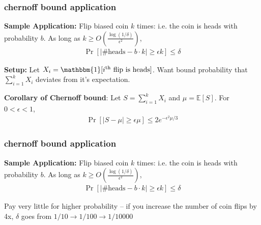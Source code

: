 \documentclass[handout,compress]{beamer}
\newcommand{\bv}[1]{\mathbf{#1}}
\newcommand{\E}{\mathbb{E}}
\begin{document}
\begin{frame}
	\frametitle{chernoff bound application}
	\small
	\textbf{Sample Application:} Flip biased coin $k$ times: i.e. the coin is heads with probability $b$. As long as $k \geq O\left(\frac{\log(1/\delta)}{\epsilon^2}\right)$,
	\vspace{-.5em}
	\begin{align*}
		\Pr[|\text{\# heads} - b\cdot k| \geq \epsilon k] \leq \delta 
	\end{align*}
	
	\textbf{Setup:}
	Let $X_i = \mathbbm{1}[i^\text{th} \text{ flip is heads}]$. Want bound probability that  $\sum_{i=1}^k X_i$ deviates from it's expectation.
	
	\textbf{Corollary of Chernoff bound}: Let $S = \sum_{i=1}^k X_i$ and $\mu = \E[S]$. For $0< \epsilon < 1$, 
	\vspace{-.75em}
	\begin{align*}
		\Pr[|S - \mu| \geq \epsilon \mu] \leq 2e^{-\epsilon^2 \mu/3}
	\end{align*} 
	\vspace{6em}
\end{frame}

\begin{frame}
	\frametitle{chernoff bound application}
	\textbf{Sample Application:} Flip biased coin $k$ times: i.e. the coin is heads with probability $b$. As long as $k \geq O\left(\frac{\log(1/\delta)}{\epsilon^2}\right)$,
	\begin{align*}
		\Pr[|\text{\# heads} - b\cdot k| \geq \epsilon k] \leq \delta 
	\end{align*}
	
	
	
	Pay very little for higher probability -- if you increase the number of coin flips by 4x, $\delta$ goes from $1/10 \rightarrow 1/100 \rightarrow 1/10000$
\end{frame}

%	
%	
%	
%	
%	
\end{document}
